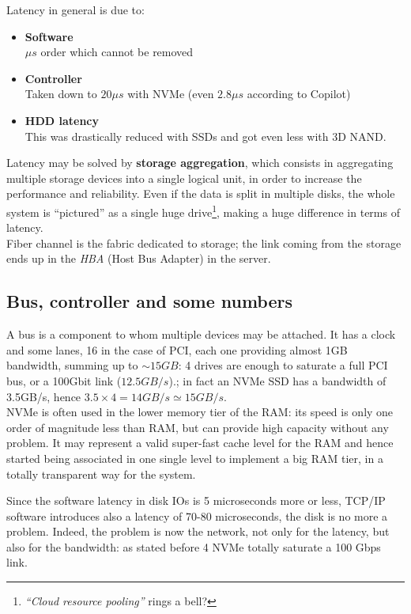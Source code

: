 Latency in general is due to:
\begin{itemize}
   \item \textbf{Software}\\
   $\mu s$ order which cannot be removed
   \item \textbf{Controller}\\
   Taken down to $20\mu s$ with NVMe (even $2.8\mu s$ according to Copilot)
   \item \textbf{HDD latency}\\
   This was drastically reduced with SSDs and got even less with 3D NAND.
\end{itemize}
Latency may be solved by \textbf{storage aggregation}, which consists in aggregating multiple storage devices into a single logical unit, in order to increase the performance and reliability.
Even if the data is split in multiple disks, the whole system is ``pictured'' as a single huge drive\footnote{\textit{``Cloud resource pooling''} rings a bell?}, making a huge difference in terms of latency.\\
Fiber channel is the fabric dedicated to storage; the link coming from the storage ends up in the \textit{HBA} (Host Bus Adapter) in the server.

\subsection{Bus, controller and some numbers}
A bus is a component to whom multiple devices may be attached. It has a clock and some lanes, 16 in the case of PCI, each one providing almost 1GB bandwidth, summing up to $\sim 15GB$: 4 drives are enough to saturate a full PCI bus, or a 100Gbit link ($12.5GB/s$).;
in fact an NVMe SSD has a bandwidth of 3.5GB/s, hence $3.5\times 4 = 14GB/s \simeq 15GB/s$.\\
NVMe is often used in the lower memory tier of the RAM: its speed is only one order of magnitude less than RAM, but can provide high capacity without any problem.
It may represent a valid super-fast cache level for the RAM and hence started being associated in one single level to implement a big RAM tier, in a totally transparent way for the system.

Since the software latency in disk IOs is 5 microseconds more or less,
TCP/IP software introduces also a latency of 70-80 microseconds, the disk is
no more a problem. Indeed, the problem is now the network, not only for the
latency, but also for the bandwidth: as stated before 4 NVMe totally saturate a 100 Gbps
link.

